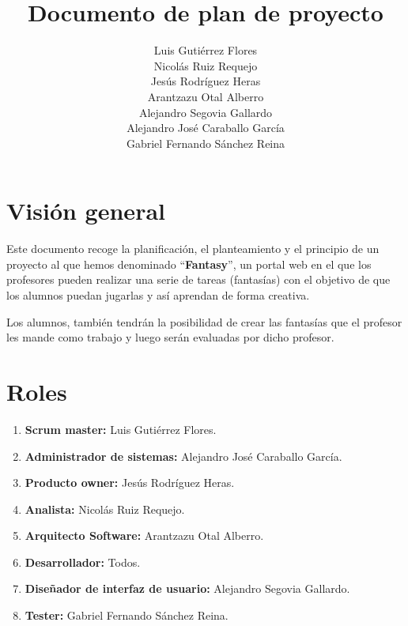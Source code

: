 \documentclass[12pt,letterpaper]{article}
\title{Documento de plan de proyecto}
\author{Luis Gutiérrez Flores\\
	Nicolás Ruiz Requejo\\
	Jesús Rodríguez Heras\\
	Arantzazu Otal Alberro\\
	Alejandro Segovia Gallardo\\
	Alejandro José Caraballo García\\
	Gabriel Fernando Sánchez Reina}
\begin{document}
	
	\maketitle

	\thispagestyle{empty}
	\newpage
	
	\tableofcontents
	\newpage
	
	
	
	
	\lstset{language=bash, numbers=left, numberstyle=\tiny, numbersep=10pt, firstnumber=1, stepnumber=1, basicstyle=\small\ttfamily, tabsize=1, extendedchars=true, inputencoding=utf8/latin1, breaklines=true}

\section{Visión general}
Este documento recoge la planificación, el planteamiento y el principio de un proyecto al que hemos denominado ``\textbf{Fantasy}'', un portal web en el que los profesores pueden realizar una serie de tareas (fantasías) con el objetivo de que los alumnos puedan jugarlas y así aprendan de forma creativa.

Los alumnos, también tendrán la posibilidad de crear las fantasías que el profesor les mande como trabajo y luego serán evaluadas por dicho profesor.

\section{Roles}
\begin{enumerate}
	\item \textbf{Scrum master:} Luis Gutiérrez Flores.
	\item \textbf{Administrador de sistemas:} Alejandro José Caraballo García.
	\item \textbf{Producto owner:} Jesús Rodríguez Heras.
	\item \textbf{Analista:} Nicolás Ruiz Requejo.
	\item \textbf{Arquitecto Software:} Arantzazu Otal Alberro.
	\item \textbf{Desarrollador:} Todos.
	\item \textbf{Diseñador de interfaz de usuario:} Alejandro Segovia Gallardo.
	\item \textbf{Tester:} Gabriel Fernando Sánchez Reina.
\end{enumerate}
\end{document}
